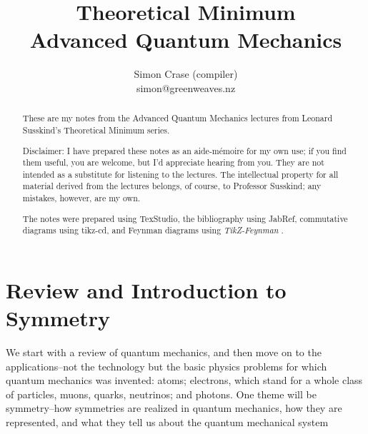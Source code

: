 \documentclass[]{article}
\title{Theoretical Minimum\\Advanced Quantum Mechanics}
\author{Simon Crase (compiler)\\simon@greenweaves.nz}
\begin{document}

\maketitle

\begin{abstract}
These are my notes from the Advanced Quantum Mechanics lectures  from Leonard Susskind's Theoretical Minimum series\cite[Advanced Quantum Mechanics]{susskind2007theoretical}.

Disclaimer: I have prepared these notes as an aide-m\'emoire for my own use; if you find them useful, you are welcome, but I'd appreciate hearing from you. They are not intended 
as a substitute for listening to the lectures. The intellectual property for all material derived from the lectures belongs, of course, to Professor Susskind; any mistakes, however, are my own.

The notes were prepared using TexStudio\cite{TexStudio}, the bibliography using JabRef\cite{Jabref}, commutative diagrams using tikz-cd\cite{stoffel2021tikz}, and Feynman diagrams using \emph{TikZ-Feynman} \cite{ellis2016tikz}.

\end{abstract}

\tableofcontents
\listoffigures
\listoftables

\listoftheorems


\section{Review and Introduction to Symmetry}

We start with a review of quantum mechanics, and then move on to the applications--not the technology but the basic physics problems for which quantum mechanics was invented: atoms; electrons, which stand for a whole class of particles, muons, quarks, neutrinos; and photons. One theme will be symmetry--how symmetries are realized in quantum mechanics, how they are represented, and what they tell us about the quantum mechanical system
\end{document}
